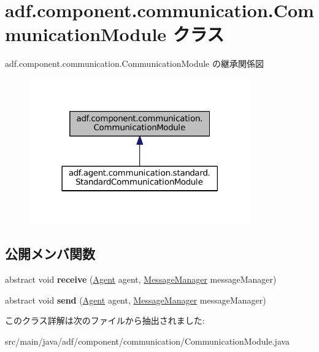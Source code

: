 \hypertarget{classadf_1_1component_1_1communication_1_1CommunicationModule}{}\section{adf.\+component.\+communication.\+Communication\+Module クラス}
\label{classadf_1_1component_1_1communication_1_1CommunicationModule}


adf.\+component.\+communication.\+Communication\+Module の継承関係図
\nopagebreak
\begin{figure}[H]
\begin{center}
\leavevmode
\includegraphics[width=270pt]{classadf_1_1component_1_1communication_1_1CommunicationModule__inherit__graph}
\end{center}
\end{figure}
\subsection*{公開メンバ関数}
\begin{DoxyCompactItemize}
\item 
\hypertarget{classadf_1_1component_1_1communication_1_1CommunicationModule_a952c4d7e78483b49e4ad5b39f7a1c4c9}{}\label{classadf_1_1component_1_1communication_1_1CommunicationModule_a952c4d7e78483b49e4ad5b39f7a1c4c9} 
abstract void {\bfseries receive} (\hyperlink{classadf_1_1agent_1_1Agent}{Agent} agent, \hyperlink{classadf_1_1agent_1_1communication_1_1MessageManager}{Message\+Manager} message\+Manager)
\item 
\hypertarget{classadf_1_1component_1_1communication_1_1CommunicationModule_a1112befc9a69844215147728d08de734}{}\label{classadf_1_1component_1_1communication_1_1CommunicationModule_a1112befc9a69844215147728d08de734} 
abstract void {\bfseries send} (\hyperlink{classadf_1_1agent_1_1Agent}{Agent} agent, \hyperlink{classadf_1_1agent_1_1communication_1_1MessageManager}{Message\+Manager} message\+Manager)
\end{DoxyCompactItemize}


このクラス詳解は次のファイルから抽出されました\+:\begin{DoxyCompactItemize}
\item 
src/main/java/adf/component/communication/Communication\+Module.\+java\end{DoxyCompactItemize}
